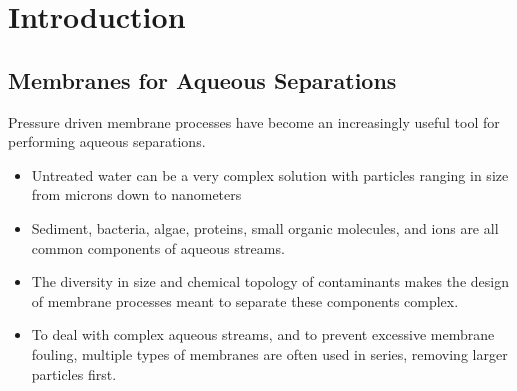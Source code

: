 \chapter{Introduction}\label{chapter:intro}

  \section{Membranes for Aqueous Separations}
  
  Pressure driven membrane processes have become an increasingly useful tool for
  performing aqueous separations.
  \begin{itemize}
    \item Untreated water can be a very complex solution with particles ranging
    in size from microns down to nanometers
    \item Sediment, bacteria, algae, proteins, small organic molecules, and ions
    are all common components of aqueous streams.
    \item The diversity in size and chemical topology of contaminants makes the
    design of membrane processes meant to separate these components complex.
    \item To deal with complex aqueous streams, and to prevent excessive membrane
    fouling, multiple types of membranes are often used in series, removing 
    larger particles first.~\cite{goosen_fouling_2005}
  \end{itemize}
  
